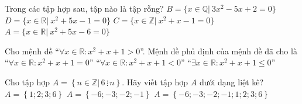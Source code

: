\documentclass[12pt,a4paper,openany,oneside]{book}
\begin{document}
\begin{ex}%
	Trong các tập hợp sau, tập nào là  tập rỗng?
	 \choice
		 {$B=\{  x \in \mathbb{Q} |~ 3x^2-5x+2=0 \}$}
		{$D=\{ x \in \mathbb{R} |~ x^2+5x-1=0 \}$}
		{\True $C=\{ x\in \mathbb{Z} |~ x^2+x-1=0  \}$}
		{$A= \{ x \in \mathbb{R} |~ x^2+5x-6=0 \}$} 
\end{ex}

\begin{ex}%
	Cho mệnh đề ``$\forall x \in  \mathbb{R} : x^2+x+1>0$''. Mệnh đề phủ định của mệnh đề đã cho là
		 {``$\forall x \in \mathbb{R} :x^2+x+1 = 0$''}
		{``$\forall x \in \mathbb{R} :x^2+x+1 < 0$''}
		{\True ``$\exists x \in \mathbb{R} :x^2+x+1  \le 0$''}
\end{ex}

\begin{ex}%
	Cho tập hợp $A = \left\{n \in \mathbb{Z}\big| \,6 \, \vdots \, n\right\}$. Hãy  viết tập hợp $A$ dưới dạng liệt kê?
		 {$A = \left\{1;2;3;6\right\}$}
		{$A = \left\{-6;-3;-2;-1\right\}$} 
		{\True $A =  \left\{-6;-3;-2;-1;1;2;3;6\right\}$}
\end{ex}
\end{document}
